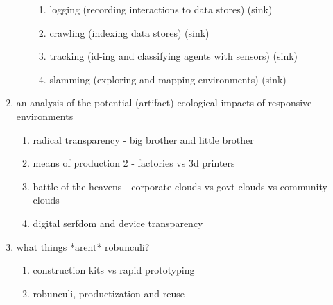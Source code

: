\begin{enumerate}
\begin{enumerate}
\begin{enumerate}
            \item logging (recording interactions to data stores) (sink)
            \item crawling (indexing data stores) (sink)
            \item tracking (id-ing and classifying agents with sensors) (sink)
            \item slamming (exploring and mapping environments) (sink)
        \end{enumerate}
    \end{enumerate}
    \item an analysis of the potential (artifact) ecological impacts of responsive environments
    \begin{enumerate}
        \item radical transparency - big brother and little brother
        \item means of production 2 - factories vs 3d printers
        \item battle of the heavens - corporate clouds vs govt clouds vs community clouds
        \item digital serfdom and device transparency
    \end{enumerate}
    \item what things *arent* robunculi?
    \begin{enumerate}
        \item construction kits vs rapid prototyping
        \item robunculi, productization and reuse
    \end{enumerate}
\end{enumerate}
